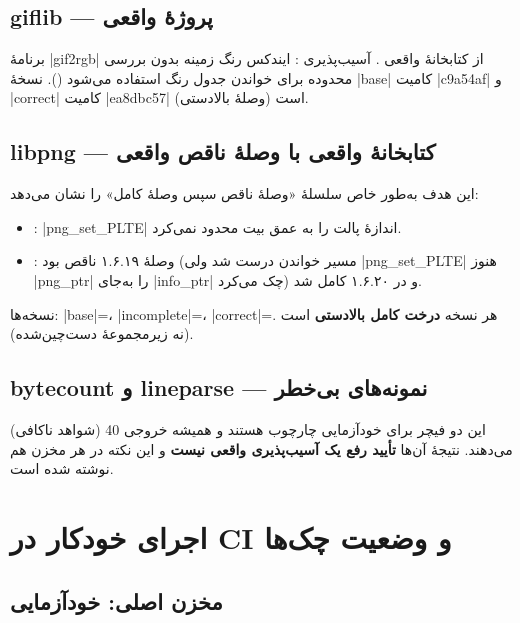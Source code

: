 \documentclass[12pt]{exam}
\begin{document}
\subsection{giflib — پروژهٔ واقعی}

برنامهٔ \codeword|gif2rgb| از کتابخانهٔ واقعی . آسیب‌پذیری
: ایندکس رنگ زمینه بدون بررسی محدوده برای خواندن جدول رنگ استفاده
می‌شود (). نسخهٔ \codeword|base| کامیت \codeword|c9a54af|
و \codeword|correct| کامیت \codeword|ea8dbc57| (وصلهٔ بالادستی) است.

\subsection{libpng — کتابخانهٔ واقعی با وصلهٔ ناقص واقعی}

این هدف به‌طور خاص سلسلهٔ «وصلهٔ ناقص سپس وصلهٔ کامل» را نشان می‌دهد:
\begin{itemize}
\item {}: \codeword|png\_set\_PLTE| اندازهٔ پالت را به عمق بیت محدود
نمی‌کرد.
\item {}: وصلهٔ ۱.۶.۱۹ ناقص بود (مسیر خواندن درست شد ولی
\codeword|png\_set\_PLTE| هنوز \codeword|png\_ptr| را به‌جای \codeword|info\_ptr| چک
می‌کرد) و در ۱.۶.۲۰ کامل شد.
\end{itemize}
نسخه‌ها: \codeword|base|=، \codeword|incomplete|=،
\codeword|correct|=. هر نسخه \textbf{درخت کامل بالادستی} است (نه زیرمجموعهٔ
دست‌چین‌شده).

\subsection{bytecount و lineparse — نمونه‌های بی‌خطر}

این دو فیچر برای خودآزمایی چارچوب هستند و همیشه خروجی 40 (شواهد ناکافی) می‌دهند.
نتیجهٔ آن‌ها \textbf{تأیید رفع یک آسیب‌پذیری واقعی نیست} و این نکته در  هر
مخزن هم نوشته شده است.

\section{اجرای خودکار در CI و وضعیت چک‌ها}

\subsection{مخزن اصلی: خودآزمایی}
\end{document}
